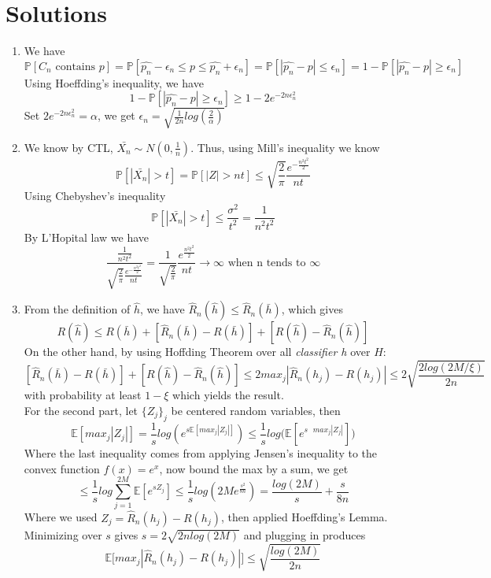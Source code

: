 \documentclass[10pt]{article}
\begin{document}
\section{Solutions}
\begin{enumerate}
  \item We have $\mathbb{P}[C_n \text{ contains } p]=\mathbb{P}[\hat{p_n} - \epsilon_n \leq p \leq \hat{p_n} + \epsilon_n] = \mathbb{P}[|\hat{p_n}-p| \leq \epsilon_n]=1 - \mathbb{P}[|\hat{p_n}-p| \geq \epsilon_n]$
Using Hoeffding's inequality, we have
\[ 1 - \mathbb{P}[|\hat{p_n}-p| \geq \epsilon_n] \geq 1-2e^{-2n\epsilon_{n}^{2}} \]
Set $2e^{-2n\epsilon_{n}^{2}} = \alpha$, we get $\epsilon_{n}=\sqrt{\frac{1}{2n}log(\frac{2}{\alpha})}$
  \item We know by CTL, $\bar{X_n} \sim N(0,\frac{1}{n})$. Thus, using Mill's inequality we know
\[\mathbb{P}[|\bar{X_n}|>t] = \mathbb{P}[|Z|>nt] \leq  \sqrt{\frac{2}{\pi}}\frac{e^{-\frac{n^2 t^2}{2}}}{nt}\]
Using Chebyshev's inequality
\[ \mathbb{P}[|\bar{X_n}|>t] \leq  \frac{\sigma^2}{t^2} = \frac{1}{n^2 t^2}\]
By L'Hopital law we have
\[\frac{\frac{1}{n^2 t^2}}{\sqrt{\frac{2}{\pi}}\frac{e^{-\frac{n^2 t^2}{2}}}{nt}}=\frac{1}{\sqrt{\frac{2}{\pi}}}\frac{e^{\frac{n^2 t^2}{2}}}{nt} \rightarrow \infty \text{ when n tends to } \infty \]
\item From the definition of $\hat{h}$, we have $\hat{R}_{n}(\hat{h}) \leqslant \hat{R}_{n}(\bar{h})$, which gives
\[ R(\hat{h}) \leqslant R(\bar{h}) + [ \hat{R}_n(\bar{h}) - R(\bar{h})] + [R(\hat{h}) - \hat{R}_n(\hat{h})] \]
On the other hand, by using Hoffding Theorem over all \textit{classifier h} over $H$: 
\[ [ \hat{R}_n(\bar{h}) - R(\bar{h})] + [R(\hat{h}) - \hat{R}_n(\hat{h})] \leqslant 2max_{j}|\hat{R}_n(h_j) -R(h_j)| \leqslant2 \sqrt{\frac{2log(2M/\xi)}{2n}} \]
with probability at least $1-\xi$ which yields the result.\\
For the second part, let $\{Z_j \}_j$ be centered random variables, then
\[ \mathbb{E}[max_{j}|Z_j|] = \frac{1}{s}log(e^{s\mathbb{E}[max_j|Z_j|]}) \leqslant \frac{1}{s} log\Big (\mathbb{E}[e^{s \text{ } max_{j}|Z_j|}] \Big) \]
Where the last inequality comes from applying Jensen's inequality to the convex function $f(x) = e^{x}$, now bound the max by a sum, we get
\[ \leqslant \frac{1}{s}log\sum_{j=1}^{2M}\mathbb{E}[e^{sZ_j}] \leqslant \frac{1}{s}log(2Me^{\frac{s^2}{8n}}) = \frac{log(2M)}{s} + \frac{s}{8n} \]
Where we used $Z_j = \hat{R}_n(h_j) - R(h_j)$, then applied Hoeffding's Lemma. Minimizing over $s$ gives $s = 2\sqrt{2nlog(2M)}$ and plugging in produces
\[ \mathbb{E}\Big [ max_{j}|\hat{R}_n(h_j) - R(h_j)| \Big ] \leqslant \sqrt{\frac{log(2M)}{2n}} \]

\end{enumerate}
\end{document}
